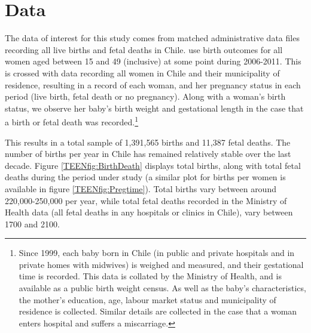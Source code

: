 


\section{Data}
\label{TEENscn:Data}
The data of interest for this study comes from matched administrative data files 
recording all live births and fetal deaths in Chile.  \Person use birth outcomes 
for all women aged between 15 and 49 (inclusive) at some point during 2006-2011.  
This is crossed with data recording all women in Chile and their municipality of
residence, resulting in a record of each woman, and her pregnancy status in each 
period (live birth, fetal death or no pregnancy).  Along with a woman's birth 
status, we observe her baby's birth weight and gestational length in the case 
that a birth or fetal death was recorded.\footnote{Since 1999, each baby born in 
Chile (in public and private hospitals and in private homes with midwives) is 
weighed and measured, and their gestational time is recorded.  This data is 
collated by the Ministry of Health, and is available as a public birth weight 
census.  As well as the baby's characteristics, the mother's education, age, 
labour market status and municipality of residence is collected.  Similar 
details are collected in the case that a woman enters hospital and suffers a 
miscarriage.}

This results in a total sample of 1,391,565 births and 11,387 fetal deaths.
The number of births per year in Chile has remained relatively stable over the 
last decade.  Figure \ref{TEENfig:BirthDeath} displays total births, along
with total fetal deaths during the period under study (a similar plot for
births per women is available in figure \ref{TEENfig:Pregtime}).  Total births 
vary between around 220,000-250,000 per year, while total fetal deaths recorded
in the Ministry of Health data (all fetal deaths in any hospitals or clinics 
in Chile), vary between 1700 and 2100.

